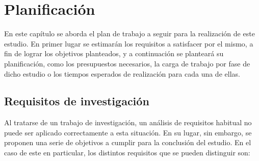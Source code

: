 \chapter{Planificación}

En este capítulo se aborda el plan de trabajo a seguir para la realización de este estudio. En primer lugar se estimarán los requisitos a satisfacer por el mismo, a fin de lograr los objetivos planteados, y a continuación se planteará su planificación, como los presupuestos necesarios, la carga de trabajo por fase de dicho estudio o los tiempos esperados de realización para cada una de ellas.

\section{Requisitos de investigación}

Al tratarse de un trabajo de investigación, un análisis de requisitos habitual no puede ser aplicado correctamente a esta situación. En su lugar, sin embargo, se proponen una serie de objetivos a cumplir para la conclusión del estudio. En el caso de este en particular, los distintos requisitos que se pueden distinguir son:

